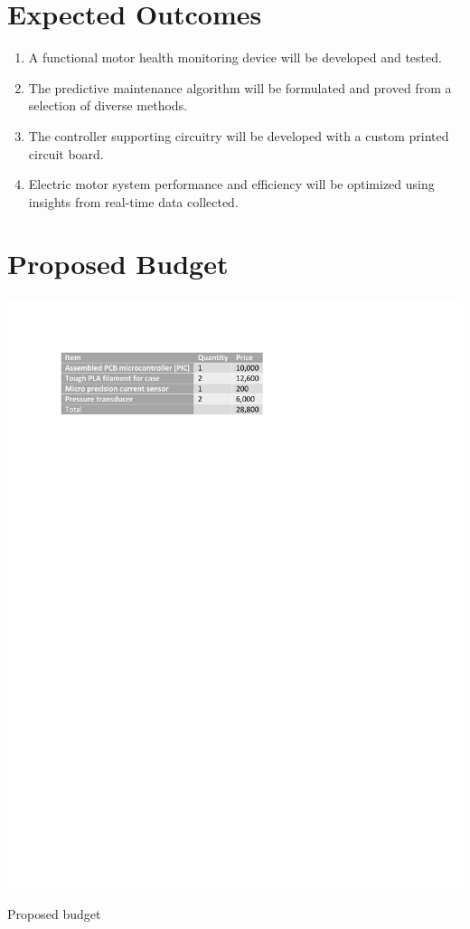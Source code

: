 \section{Expected Outcomes}
\begin{enumerate}
\item A functional motor health monitoring device will be developed and tested.
\item The predictive maintenance algorithm will be formulated and proved from a selection of diverse methods.
\item The controller supporting circuitry will be developed with a custom printed circuit board.
\item Electric motor system performance and efficiency will be optimized using insights from real-time data collected.
\end{enumerate}
\newpage
\section{Proposed Budget}
\begin{table}[!h]
\includegraphics{Figures/budget}
\caption{Proposed budget}
\end{table}
